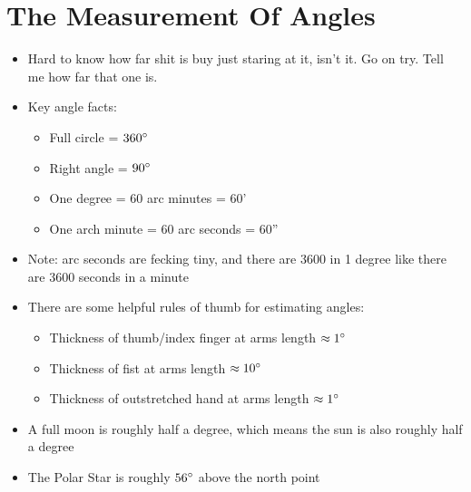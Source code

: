 \documentclass[a4paper, 11pt]{article}
\begin{document}
\section{The Measurement Of Angles}
\begin{itemize}
\item Hard to know how far shit is buy just staring at it, isn't it. Go on try. Tell me how far that one is.
\item Key angle facts:
	\begin{itemize}
	\item Full circle = \(360\degree\)
	\item Right angle = \(90\degree\)
	\item One degree = 60 arc minutes = 60'
	\item One arch minute = 60 arc seconds = 60''
	\end{itemize}
\item Note: arc seconds are fecking tiny, and there are 3600 in 1 degree like there are 3600 seconds in a minute
\item There are some helpful rules of thumb for estimating angles:
	\begin{itemize}
	\item Thickness of thumb/index finger at arms length \(\approx 1\degree\)
	\item Thickness of fist at arms length \(\approx 10\degree\)
	\item Thickness of outstretched hand at arms length \(\approx 1\degree\)
	\end{itemize}
\item A full moon is roughly half a degree, which means the sun is also roughly half a degree
\item The Polar Star is roughly \(56\degree\) above the north point
\end{itemize}
\end{document}
